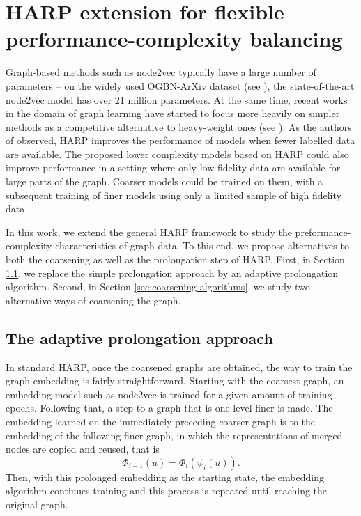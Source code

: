 \section{HARP extension for flexible performance-complexity balancing}\label{sec:our-method}

Graph-based methods such as node2vec typically have a large number of parameters -- on the widely used OGBN-ArXiv dataset (see \cite{hu_open_2021}), the state-of-the-art node2vec model has over 21 million parameters. At the same time, recent works in the domain of graph learning have started to focus more heavily on simpler methods as a competitive alternative to heavy-weight ones (see \cite{frasca_sign_2020,huang_combining_2020,salha_keep_2019,zhang_eigen-gnn_2021}). As the authors of \cite{chen_harp_2018} observed, HARP improves the performance of models when fewer labelled data are available. The proposed lower complexity models based on HARP could also improve performance in a setting where only low fidelity data are available for large parts of the graph. Coarser models could be trained on them, with a subsequent training of finer models using only a limited sample of high fidelity data.

In this work, we extend the general HARP framework to study the preformance-complexity characteristics of graph data. To this end, we propose alternatives to both the coarsening as well as the prolongation step of HARP. First, in Section \ref{sec:adaptive-prolongation}, we replace the simple prolongation approach by an adaptive prolongation algorithm. Second, in Section \ref{sec:coarsening-algorithms}, we study two alternative ways of coarsening the graph.

\subsection{The adaptive prolongation approach}\label{sec:adaptive-prolongation}

In standard HARP, once the coarsened graphs are obtained, the way to train the graph embedding is fairly straightforward. Starting with the coarsest graph, an embedding model such as node2vec is trained for a given amount of training epochs. Following that, a step to a graph that is one level finer is made. The embedding learned on the immediately preceding coarser graph is  to the embedding of the following finer graph, in which the representations of merged nodes are copied and reused, that is
\[ \Phi_{i - 1} \left( u \right) = \Phi_i \left( \psi_i \left( u \right) \right)\text{.} \]
 Then, with this prolonged embedding as the starting state, the embedding algorithm continues training and this process is repeated until reaching the original graph.

